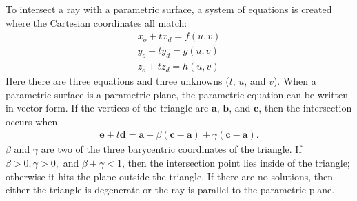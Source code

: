 To intersect a ray with a parametric surface, a system of equations is created where the Cartesian coordinates all match:
\begin{align}
x_o + tx_d = f(u,v) \\
y_o + ty_d = g(u,v) \\
z_o + tz_d = h(u,v)
\end{align}
Here there are three equations and three unknowns ($t$, $u$, and $v$).
When a parametric surface is a parametric plane, the parametric equation can be written in vector form.
If the vertices of the triangle are $\mathbf{a}$, $\mathbf{b}$, and $\mathbf{c}$, then the intersection occurs when
\begin{align}
\mathbf{e} + t\mathbf{d} = \mathbf{a} + \beta(\mathbf{c}-\mathbf{a}) + \gamma(\mathbf{c}-\mathbf{a}).
\end{align}
$\beta$ and $\gamma$ are two of the three barycentric coordinates of the triangle. 
If $\beta > 0, \gamma > 0,$ and $\beta + \gamma < 1$, then the intersection point lies inside of the triangle; otherwise it hits the plane outside the triangle.
If there are no solutions, then either the triangle is degenerate or the ray is parallel to the parametric plane.

